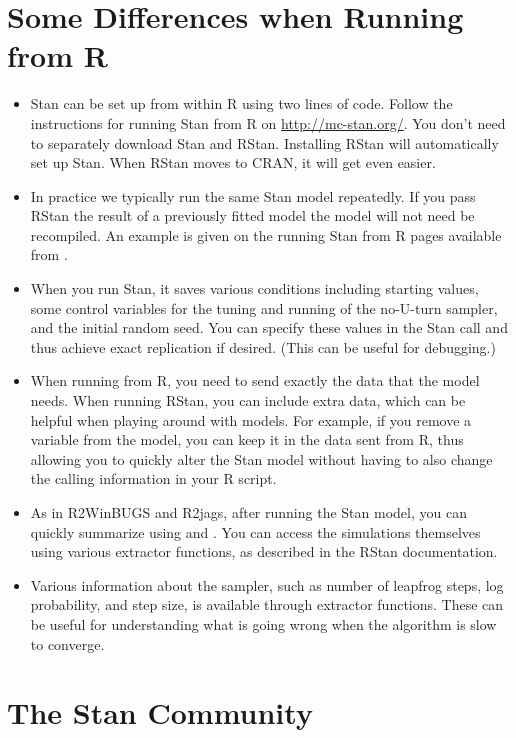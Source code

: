 \section{Some Differences when Running from R}

\begin{itemize}

\item Stan can be set up from within R using two lines of code.
  Follow the instructions for running Stan from R on
  \url{http://mc-stan.org/}.  You don't need to separately download
  Stan and RStan.  Installing RStan will automatically set up Stan.
  When RStan moves to CRAN, it will get even easier.
\item In practice we typically run the same Stan model repeatedly.  If
  you pass RStan the result of a previously fitted model the model will
  not need be recompiled. An example is given on the running
  Stan from R pages available from .
\item When you run Stan, it saves various conditions including
  starting values, some control variables for the tuning and running
  of the no-U-turn sampler, and the initial random seed. You can
  specify these values in the Stan call and thus achieve exact
  replication if desired.  (This can be useful for debugging.)
\item When running \BUGS from R, you need to send exactly the data
  that the model needs.  When running RStan, you can include extra
  data, which can be helpful when playing around with models.  For
  example, if you remove a variable  from the model, you can keep
  it in the data sent from R, thus allowing you to quickly alter the
  Stan model without having to also change the calling information in
  your R script.
\item As in R2WinBUGS and R2jags, after running the Stan model, you
  can quickly summarize using  and .  You
  can access the simulations themselves using various extractor
  functions, as described in the RStan documentation.
\item Various information about the sampler, such as number of
  leapfrog steps, log probability, and step size, is available through
  extractor functions.   These can be useful for understanding what is
  going wrong when the algorithm is slow to converge.
\end{itemize}

\section{The Stan Community}

